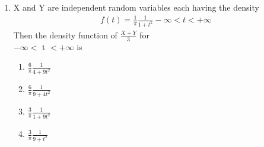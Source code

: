 \renewcommand{\theequation}{\theenumi}
\renewcommand{\thefigure}{\theenumi}
\renewcommand{\thetable}{\theenumi}
\begin{enumerate}[label=\thesection.\arabic*.,ref=\thesection.\theenumi]


%
\item X and Y are independent random variables each having the density
\begin{align}
    f(t) = \displaystyle\frac{1}{\pi} \frac{1}{1+{t}^2} -\infty < t < +\infty
\end{align}
Then the density function of $\displaystyle\frac{X+Y}{3}$ for \\$-\infty <$ t $< +\infty$ is\bigskip
    \begin{enumerate}\itemsep0.5cm
        \item $\displaystyle\frac{6}{\pi} \frac{1}{4+9{t}^2}$
        \item $\displaystyle\frac{6}{\pi} \frac{1}{9+4{t}^2}$
        \item $\displaystyle\frac{3}{\pi} \frac{1}{1+9{t}^2}$
        \item $\displaystyle\frac{3}{\pi} \frac{1}{9+{t}^2}$
    \end{enumerate}

%
\solution



\end{enumerate}
